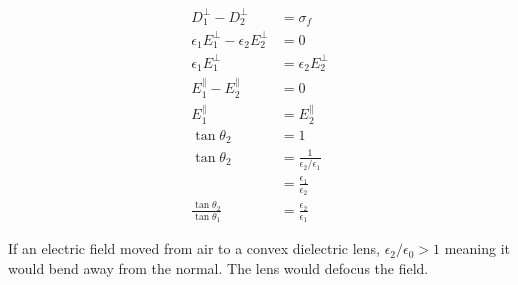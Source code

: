 \documentclass{article}
\begin{document}
\subsection{}

\begin{align*}
  D_1^\perp - D_2^\perp                       & = \sigma_f                          \\
  \epsilon_1 E_1^\perp - \epsilon_2 E_2^\perp & = 0                                 \\
  \epsilon_1 E_1^\perp                        & = \epsilon_2 E_2^\perp              \\
  E_1^\parallel - E_2^\parallel               & = 0                                 \\
  E_1^\parallel                               & = E_2^\parallel                     \\
  \tan \theta_2                               & = 1                                 \\
  \tan \theta_2                               & = \frac{1}{\epsilon_2 / \epsilon_1} \\
                                              & = \frac{\epsilon_1}{\epsilon_2}     \\
  \frac{\tan \theta_2}{\tan \theta_1}         & = \frac{\epsilon_2}{\epsilon_1}
\end{align*}

If an electric field moved from air to a convex dielectric lens, $\epsilon_2 / \epsilon_0 > 1$ meaning it would bend away from the normal. The lens would defocus the field.

\setcounter{subsection}{38}
\subsection{}
\end{document}
